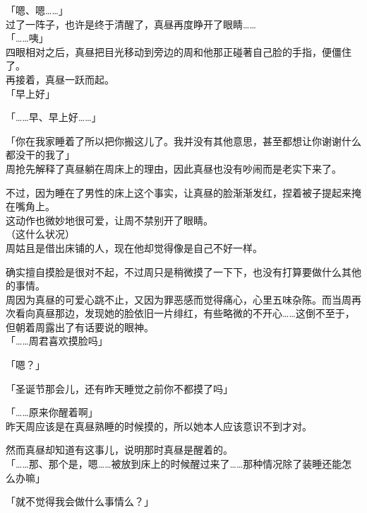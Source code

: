 「嗯、嗯……」\\

过了一阵子，也许是终于清醒了，真昼再度睁开了眼睛……\\

「……咦」\\

四眼相对之后，真昼把目光移动到旁边的周和他那正碰著自己脸的手指，便僵住了。\\

再接着，真昼一跃而起。\\

「早上好」

「……早、早上好……」

「你在我家睡着了所以把你搬这儿了。我并没有其他意思，甚至都想让你谢谢什么都没干的我了」\\

周抢先解释了真昼躺在周床上的理由，因此真昼也没有吵闹而是老实下来了。

不过，因为睡在了男性的床上这个事实，让真昼的脸渐渐发红，捏着被子提起来掩在嘴角上。\\

这动作也微妙地很可爱，让周不禁别开了眼睛。\\

（这什么状况）\\

周姑且是借出床铺的人，现在他却觉得像是自己不好一样。

确实擅自摸脸是很对不起，不过周只是稍微摸了一下下，也没有打算要做什么其他的事情。\\

周因为真昼的可爱心跳不止，又因为罪恶感而觉得痛心，心里五味杂陈。而当周再次看向真昼那边，发现她的脸依旧一片绯红，有些略微的不开心……这倒不至于，但朝着周露出了有话要说的眼神。\\

「……周君喜欢摸脸吗」

「嗯？」

「圣诞节那会儿，还有昨天睡觉之前你不都摸了吗」

「……原来你醒着啊」\\

昨天周应该是在真昼熟睡的时候摸的，所以她本人应该意识不到才对。

然而真昼却知道有这事儿，说明那时真昼是醒着的。\\

「……那、那个是，嗯……被放到床上的时候醒过来了……那种情况除了装睡还能怎么办嘛」

「就不觉得我会做什么事情么？」

